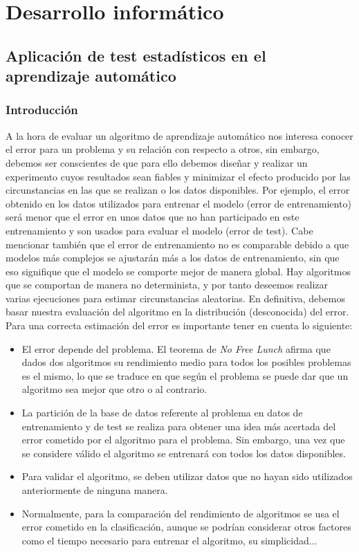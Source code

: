 %
%

\chapter{Desarrollo informático}

\section{Aplicación de test estadísticos en el aprendizaje automático}

\subsection{Introducción}

	A la hora de evaluar un algoritmo de aprendizaje automático nos interesa conocer el error para un problema y su relación con respecto a otros, sin embargo, debemos ser conscientes de que para ello debemos diseñar y realizar un experimento cuyos resultados sean fiables y minimizar el efecto producido por las circunstancias en las que se realizan o los datos disponibles. Por ejemplo, el error obtenido en los datos utilizados para entrenar el modelo (error de entrenamiento) será menor que el error en unos datos que no han participado en este entrenamiento y son usados para evaluar el modelo (error de test). Cabe mencionar también que el error de entrenamiento no es comparable debido a que modelos más complejos se ajustarán más a los datos de entrenamiento, sin que eso signifique que el modelo se comporte mejor de manera global. Hay algoritmos que se comportan de manera no determinista, y por tanto deseemos realizar varias ejecuciones para estimar circunstancias aleatorias. En definitiva, debemos basar nuestra evaluación del algoritmo en la distribución (desconocida) del error. Para una correcta estimación del error es importante tener en cuenta lo siguiente:
	
	\begin{itemize}
	\item El error depende del problema. El teorema de \textit{No Free Lunch} afirma que dados dos algoritmos su rendimiento medio para todos los posibles problemas es el mismo, lo que se traduce en que según el problema se puede dar que un algoritmo sea mejor que otro o al contrario.
	\item La partición de la base de datos referente al problema en datos de entrenamiento y de test se realiza para obtener una idea más acertada del error cometido por el algoritmo para el problema. Sin embargo, una vez que se considere válido el algoritmo se entrenará con todos los datos disponibles.
	\item Para validar el algoritmo, se deben utilizar datos que no hayan sido utilizados anteriormente de ninguna manera.
	\item Normalmente, para la comparación del rendimiento de algoritmos se usa el error cometido en la clasificación, aunque se podrían considerar otros factores como el tiempo necesario para entrenar el algoritmo, su simplicidad...
	\end{itemize}
	
